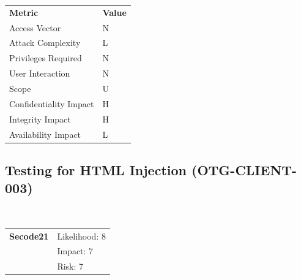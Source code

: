 \documentclass[headsepline,footsepline,footinclude=false,oneside,fontsize=11pt,paper=a4,listof=totoc,bibliography=totoc]{scrbook} %
\begin{document}
\begin{center}
	\begin{tabular}{ll}
		\rowcolor[HTML]{34CDF9}
		{\color[HTML]{ECF4FF} \textbf{Metric}}        & {\color[HTML]{ECF4FF} \textbf{Value}} \\
		\rowcolor[HTML]{BBDAFF}
		{\color[HTML]{333333} Access Vector}          & {\color[HTML]{333333} } N              \\
		\rowcolor[HTML]{ECF4FF}
		{\color[HTML]{333333} Attack Complexity}      & {\color[HTML]{333333} } L              \\
		\rowcolor[HTML]{BBDAFF}
		{\color[HTML]{333333} Privileges Required}    & {\color[HTML]{333333} } N              \\
		\rowcolor[HTML]{ECF4FF}
		{\color[HTML]{333333} User Interaction}       & {\color[HTML]{333333} } N              \\
		\rowcolor[HTML]{BBDAFF}
		{\color[HTML]{333333} Scope}                  & {\color[HTML]{333333} } U              \\
		\rowcolor[HTML]{ECF4FF}
		{\color[HTML]{333333} Confidentiality Impact} & {\color[HTML]{333333} } H              \\
		\rowcolor[HTML]{BBDAFF}
		{\color[HTML]{333333} Integrity Impact}       & {\color[HTML]{333333} } H              \\
		\rowcolor[HTML]{ECF4FF}
		{\color[HTML]{333333} Availability Impact}    & {\color[HTML]{333333} } L
	\end{tabular}
\end{center}
\pagebreak

\subsection{Testing for HTML Injection (OTG-CLIENT-003)}\
\begin{tabular}{cR{12cm}}
	\textbf{Secode21} & Likelihood: 8\\& Impact: 7\\& Risk: 7
\end{tabular}
\end{document}
